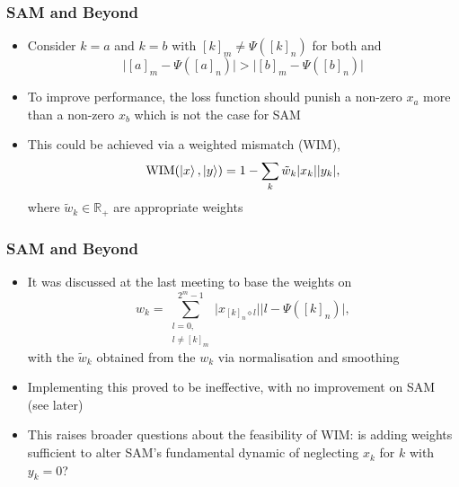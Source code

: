 \documentclass{beamer}
\begin{document}
\begin{frame}
\frametitle{SAM and Beyond}
\begin{itemize}
\item Consider $k=a$ and $k=b$ with $[k]_m \neq \Psi([k]_n)$ for both and 
\begin{equation}
\Big|[a]_m - \Psi([a]_n) \Big| > \Big|[b]_m - \Psi([b]_n) \Big| 
\end{equation}
\item To improve performance, the loss function should punish a non-zero $x_a$ more than a non-zero $x_b$ which is not the case for SAM
\item This could be achieved via a \alert{weighted mismatch (WIM)}, 
\begin{equation}
\text{WIM}(\ket{x}, \ket{y}) =  1 - \sum_k \tilde{w}_k |x_k| |y_k |, 
\end{equation}
where $\tilde{w}_k \in \mathbb{R}_+$ are appropriate weights
\end{itemize}
\end{frame}

\begin{frame}
\frametitle{SAM and Beyond}
\begin{itemize}
\item It was discussed at the last meeting to base the weights on
\begin{equation}
w_k = \sum^{2^m -1}_{\substack{l=0, \\ l \neq [k]_m}} \Big|x_{[k]_n \diamond l} \Big| \Big| l - \Psi([k]_n) \Big|,
\end{equation}
with the $\tilde{w}_k$ obtained from the $w_k$ via normalisation and smoothing
\item Implementing this \alert{proved to be ineffective}, with no improvement on SAM  (see later)
\item This raises broader questions about the \alert{feasibility of WIM}: is adding weights sufficient to alter SAM's fundamental dynamic of neglecting $x_k$ for $k$ with $y_k =0$?
\end{itemize}
\end{frame}
\end{document}
